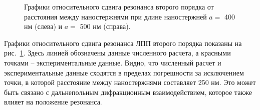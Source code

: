 
\begin{figure}
\caption{Графики относительного сдвига резонанса второго порядка от расстояния между наностержнями при длине наностержней $ a = $ 400 нм (слева) и $ a = $ 500 нм (справа).}
\label{img:shift}
\end{figure}

Графики относительного сдвига резонанса ЛПП второго порядка показаны на рис.~\ref{img:shift}. Здесь линией обозначены данные численного расчета, а красными точками -- экспериментальные данные. Видно, что численный расчет и экспериментальные данные сходятся в пределах погрешности за исключением точки, в которой расстояние между наностержнями составляет 250 нм. Это может быть связано с дальнепольным дифракционным взаимодействием, которое также влияет на положение резонанса.

